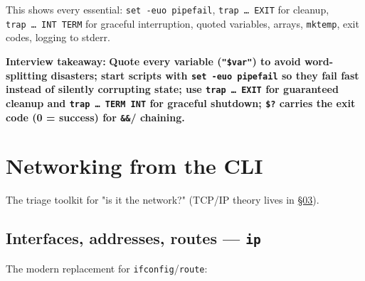\documentclass[11pt]{article}
\newenvironment{Shaded}{\begin{snugshade}}{\end{snugshade}}
\newcommand{\AttributeTok}[1]{\textcolor[rgb]{0.16,0.50,0.73}{#1}}
\newcommand{\BuiltInTok}[1]{\textcolor[rgb]{0.50,0.55,0.55}{#1}}
\newcommand{\ControlFlowTok}[1]{\textcolor[rgb]{0.99,0.74,0.29}{\textbf{#1}}}
\newcommand{\DecValTok}[1]{\textcolor[rgb]{0.96,0.45,0.00}{#1}}
\newcommand{\ExtensionTok}[1]{\textcolor[rgb]{0.00,0.60,1.00}{\textbf{#1}}}
\newcommand{\FunctionTok}[1]{\textcolor[rgb]{0.56,0.27,0.68}{#1}}
\newcommand{\KeywordTok}[1]{\textcolor[rgb]{0.81,0.81,0.76}{\textbf{#1}}}
\newcommand{\NormalTok}[1]{\textcolor[rgb]{0.81,0.81,0.76}{#1}}
\newcommand{\OperatorTok}[1]{\textcolor[rgb]{0.81,0.81,0.76}{#1}}
\newcommand{\StringTok}[1]{\textcolor[rgb]{0.96,0.31,0.31}{#1}}
\newcommand{\VariableTok}[1]{\textcolor[rgb]{0.15,0.68,0.68}{#1}}
\begin{document}
\begin{Shaded}
\end{Shaded}

This shows every essential: \texttt{set\ -euo\ pipefail}, \texttt{trap\ …\ EXIT} for cleanup, \texttt{trap\ …\ INT\ TERM} for graceful interruption, quoted variables, arrays, \texttt{mktemp}, exit codes, logging to stderr.

\textbf{Interview takeaway:} \textbf{Quote every variable (\texttt{"\$var"}) to avoid word-splitting disasters; start scripts with \texttt{set\ -euo\ pipefail} so they fail fast instead of silently corrupting state; use \texttt{trap\ \textquotesingle{}…\textquotesingle{}\ EXIT} for guaranteed cleanup and \texttt{trap\ …\ TERM\ INT} for graceful shutdown; \texttt{\$?} carries the exit code (0 = success) for \texttt{\&\&}/\texttt{\textbar{}\textbar{}} chaining.}

\section{Networking from the CLI}\label{networking-from-the-cli}

The triage toolkit for "is it the network?" (TCP/IP theory lives in \hyperlink{section.03}{\textcolor{acc}{§03}}).

\subsection{\texorpdfstring{Interfaces, addresses, routes --- \texttt{ip}}{Interfaces, addresses, routes --- ip}}\label{interfaces-addresses-routes--ip}

The modern replacement for \texttt{ifconfig}/\texttt{route}:

\end{document}

